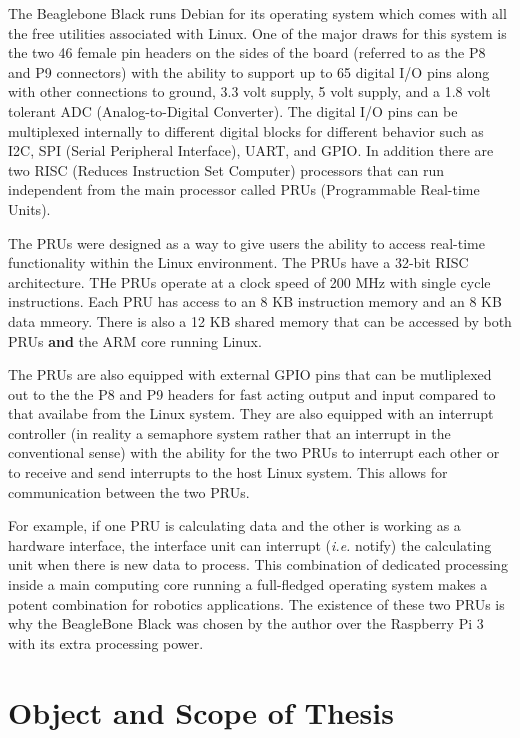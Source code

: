 \documentclass[12pt,oneside,final]{siuethesis}
\theoremstyle{definition}
\begin{document}
The Beaglebone Black runs Debian for its operating system which comes with all the free utilities associated with Linux. One of the major draws for this system is the two 46 female pin headers on the sides of the board (referred to as the P8 and P9 connectors) with the ability to support up to 65 digital I/O pins along with other connections to ground, 3.3 volt supply, 5 volt supply, and a 1.8 volt tolerant ADC (Analog-to-Digital Converter). The digital I/O pins can be multiplexed internally to different digital blocks for different behavior such as I2C, SPI (Serial Peripheral Interface), UART, and GPIO. In addition there are two RISC (Reduces Instruction Set Computer) processors that can run independent from the main processor called PRUs (Programmable Real-time Units).
  
The PRUs were designed as a way to give users the ability to access real-time functionality within the Linux environment.  The PRUs have a 32-bit RISC architecture. THe PRUs operate at a clock speed of 200 MHz with single cycle instructions. Each PRU has access to an 8 KB instruction memory and an 8 KB data mmeory. There is also a 12 KB shared memory that can be accessed by both PRUs \textbf{and} the ARM core running Linux. 

The PRUs are also equipped with external GPIO pins that can be mutliplexed out to the the P8 and P9 headers for fast acting output and input compared to that availabe from the Linux system.  They are also equipped with an interrupt controller (in reality a semaphore system rather that an interrupt in the conventional sense) with the ability for the two PRUs to interrupt each other or to receive and send interrupts to the host Linux system.  This allows for communication between the two PRUs. 

For example, if one PRU is calculating data and the other is working as a hardware interface, the interface unit can interrupt (\emph{i.e.} notify) the calculating unit when there is new data to process. This combination of dedicated processing inside a main computing core running a full-fledged operating system makes a potent combination for robotics applications. The existence of these two PRUs is why the BeagleBone Black was chosen by the author over the Raspberry Pi 3 with its extra processing power.


\section{Object and Scope of Thesis}
\end{document}
